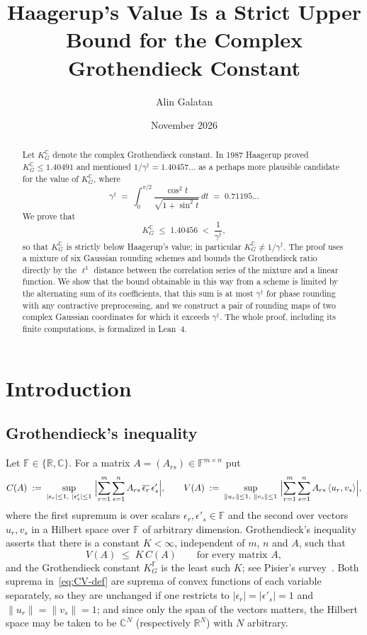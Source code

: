 \documentclass[11pt,reqno]{amsart}
\title[Haagerup's value is a strict upper bound for \texorpdfstring{$\KGC$}{KGC}]{Haagerup's Value Is a Strict Upper Bound for the Complex Grothendieck Constant}
\author{Alin Galatan}
\date{November 2026}
\theoremstyle{definition}
\numberwithin{equation}{section}
\newcommand{\C}{\mathbb{C}}
\newcommand{\R}{\mathbb{R}}
\newcommand{\KGC}{K_G^{\C}}
\newcommand{\gd}{\gamma^\dagger}
\begin{document}
\begin{abstract}
Let $\KGC$ denote the complex Grothendieck constant. In 1987 Haagerup proved $\KGC\le 1.40491$ and mentioned $1/\gd = 1.40457\ldots$ as a perhaps more plausible candidate for the value of $\KGC$, where
\[
  \gd \;=\; \int_0^{\pi/2} \frac{\cos^2 t}{\sqrt{1 + \sin^2 t}}\,dt \;=\; 0.71195\ldots
\]
We prove that
\[
  \KGC \;\le\; 1.40456 \;<\; \frac{1}{\gd},
\]
so that $\KGC$ is strictly below Haagerup's value; in particular $\KGC\ne1/\gd$. The proof uses a mixture of six Gaussian rounding schemes and bounds the Grothendieck ratio directly by the $\ell^1$ distance between the correlation series of the mixture and a linear function. We show that the bound obtainable in this way from a scheme is limited by the alternating sum of its coefficients, that this sum is at most $\gd$ for phase rounding with any contractive preprocessing, and we construct a pair of rounding maps of two complex Gaussian coordinates for which it exceeds $\gd$. The whole proof, including its finite computations, is formalized in Lean~4.
\end{abstract}

\maketitle

\section{Introduction}

\subsection{Grothendieck's inequality}
Let $\mathbb{F}\in\{\R,\C\}$. For a matrix $A=(A_{rs})\in\mathbb{F}^{m\times n}$ put
\begin{equation}\label{eq:CV-def}
  C(A) \;:=\; \sup_{|\epsilon_r| \le 1,\ |\epsilon'_s| \le 1}\ \Bigl|\sum_{r=1}^m \sum_{s=1}^n A_{rs}\, \overline{\epsilon_r}\, \epsilon'_s\Bigr|,
  \qquad
  V(A) \;:=\; \sup_{\|u_r\| \le 1,\ \|v_s\| \le 1}\ \Bigl| \sum_{r=1}^m \sum_{s=1}^n A_{rs}\, \langle u_r, v_s \rangle \Bigr|,
\end{equation}
where the first supremum is over scalars $\epsilon_r,\epsilon'_s\in\mathbb{F}$ and the second over vectors $u_r,v_s$ in a Hilbert space over $\mathbb{F}$ of arbitrary dimension. Grothendieck's inequality~\cite{Gro53} asserts that there is a constant $K<\infty$, independent of $m$, $n$ and $A$, such that
\begin{equation}\label{eq:groth-def}
  V(A) \;\le\; K\, C(A)\qquad\text{for every matrix } A ,
\end{equation}
and the Grothendieck constant $K_G^{\mathbb{F}}$ is the least such $K$; see Pisier's survey~\cite{Pis12}. Both suprema in~\eqref{eq:CV-def} are suprema of convex functions of each variable separately, so they are unchanged if one restricts to $|\epsilon_r|=|\epsilon'_s|=1$ and $\|u_r\|=\|v_s\|=1$; and since only the span of the vectors matters, the Hilbert space may be taken to be $\C^N$ (respectively $\R^N$) with $N$ arbitrary.
\end{document}
